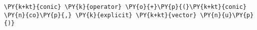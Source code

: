 \begin{Verbatim}[commandchars=\\\{\}]
    \PY{k+kt}{conic} \PY{k}{operator} \PY{o}{+}\PY{p}{(}\PY{k+kt}{conic} \PY{n}{co}\PY{p}{,} \PY{k}{explicit} \PY{k+kt}{vector} \PY{n}{u}\PY{p}{)}
\end{Verbatim}
